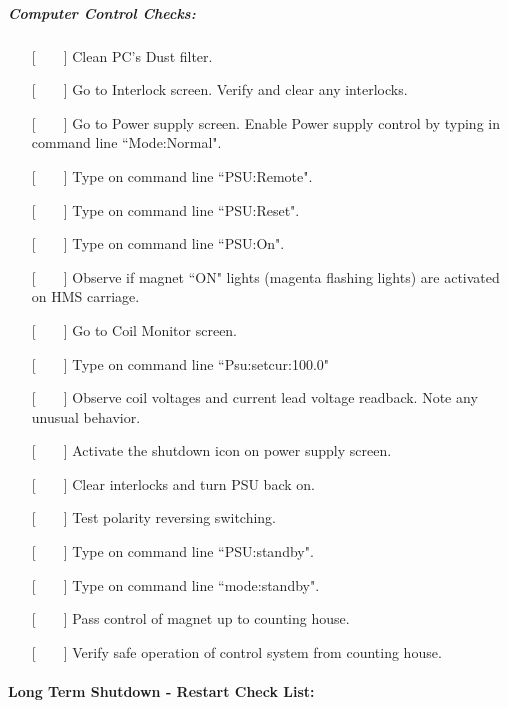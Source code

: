 \subparagraph{Computer Control Checks:}

\begin{itemize}
\item[{[~~~~]}]{Clean PC's Dust filter.}
\item[{[~~~~]}]{Go to Interlock screen. Verify and clear any interlocks.}
\item[{[~~~~]}]{Go to Power supply screen. Enable Power supply control by
typing in command line ``Mode:Normal".}
\item[{[~~~~]}]{Type on command line ``PSU:Remote".}
\item[{[~~~~]}]{Type on command line ``PSU:Reset".}
\item[{[~~~~]}]{Type on command line ``PSU:On".}
\item[{[~~~~]}]{Observe if magnet ``ON" lights (magenta flashing lights) are
activated on HMS carriage.}
\item[{[~~~~]}]{Go to Coil Monitor screen.}
\item[{[~~~~]}]{Type on command line ``Psu:setcur:100.0"}
\item[{[~~~~]}]{Observe coil voltages and current lead voltage readback. Note
any unusual behavior.}
\item[{[~~~~]}]{Activate the shutdown icon on power supply screen.}
\item[{[~~~~]}]{Clear interlocks and turn PSU back on.}
\item[{[~~~~]}]{Test polarity reversing switching.}
\item[{[~~~~]}]{Type on command line ``PSU:standby".}
\item[{[~~~~]}]{Type on command line ``mode:standby".}
\item[{[~~~~]}]{Pass control of magnet up to counting house.}
\item[{[~~~~]}]{Verify safe operation of control system from counting house.}
\end{itemize}

\vspace{0.5in}
\hspace*{3.5in}{\underline{~~~~~~~~~~~~~~~~~~~~~~~~~~~~~~~~~}}
\newline
\hspace*{3.5in}{Signature~~~~~~~~~~~~Date}


\newpage
\paragraph{Long Term Shutdown - Restart Check List:}

